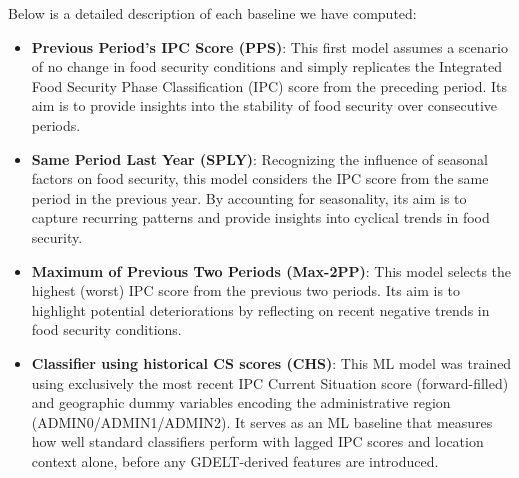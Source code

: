 \documentclass{article}
\begin{document}
Below is a detailed description of each baseline we have computed:
\begin{itemize}

\item \textbf{Previous Period's IPC Score (PPS)}: This first model assumes a scenario of no change in food security conditions and simply replicates the Integrated Food Security Phase Classification (IPC) score from the preceding period. Its aim is to provide insights into the stability of food security over consecutive periods.

\item \textbf{Same Period Last Year (SPLY)}: Recognizing the influence of seasonal factors on food security, this model considers the IPC score from the same period in the previous year. By accounting for seasonality, its aim is to capture recurring patterns and provide insights into cyclical trends in food security.

\item \textbf{Maximum of Previous Two Periods (Max-2PP)}: This model selects the highest (worst) IPC score from the previous two periods. Its aim is to highlight potential deteriorations by reflecting on recent negative trends in food security conditions.

\item \textbf{Classifier using historical CS scores (CHS)}: This ML model was trained using exclusively the most recent IPC Current Situation score (forward-filled) and geographic dummy variables encoding the administrative region (ADMIN0/ADMIN1/ADMIN2). It serves as an ML baseline that measures how well standard classifiers perform with lagged IPC scores and location context alone, before any GDELT-derived features are introduced.
\end{itemize}
\end{document}
